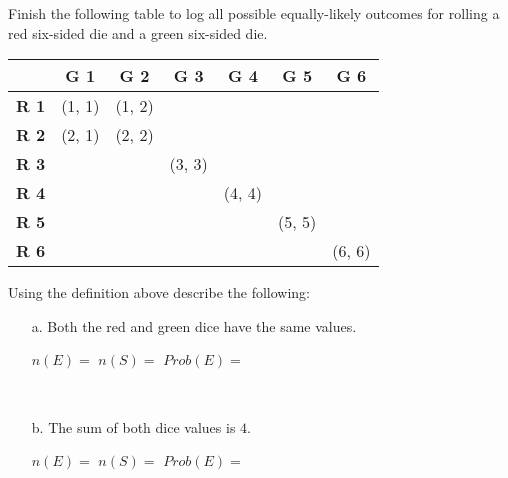 {    \newpage

    \begin{questionNOGRADE}{\thequestion}
        Finish the following table to log all possible equally-likely
        outcomes for rolling a red six-sided die and a green six-sided die.

        \large 
        \begin{center}
            \begin{tabular}{c | c c c c c c}
                & \textbf{G 1} & \textbf{G 2} & \textbf{G 3} & \textbf{G 4} & \textbf{G 5} & \textbf{G 6}
                \\ \hline
                \textbf{R 1}
                    & (1, 1)
                    & (1, 2)
                \\
                \textbf{R 2}
                    & (2, 1)
                    & (2, 2)
                \\
                \textbf{R 3}
                    & & & (3, 3)
                \\
                \textbf{R 4}
                    & & & &(4, 4)
                \\
                \textbf{R 5}
                    & & & & & (5, 5)
                \\
                \textbf{R 6}
                    & & & & & & (6, 6)
            \end{tabular}
        \end{center}
        \normalsize

        Using the definition above describe the following:

        \begin{enumerate}
            \item[a.] Both the red and green dice have the same values.
            
                \vspace{1cm}
                
                $n(E) =$ {\fitb}
                \tab
                $n(S) =$ {\fitb}
                \tab
                $Prob(E) = $ {\fitb}

            ~\\
            \item[b.] The sum of both dice values is $4$.

                \vspace{1cm}
                
                $n(E) = $ {\fitb}
                \tab
                $n(S) = $ {\fitb}
                \tab
                $Prob(E) = $ {\fitb}


\end{enumerate}
\end{questionNOGRADE}}
